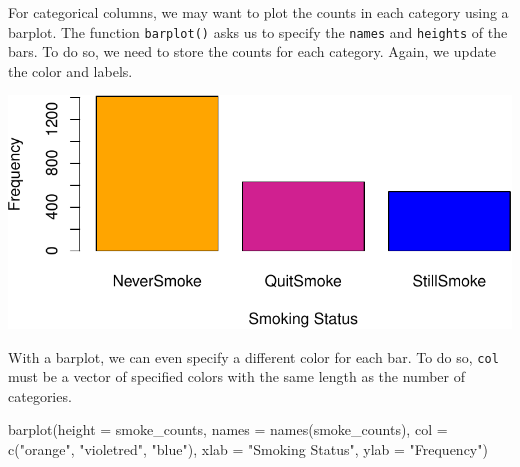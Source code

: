 \documentclass[
  letterpaper,
]{latex/krantz}
\makeatletter
\newenvironment{Shaded}{\begin{snugshade}}{\end{snugshade}}
\newcommand{\AttributeTok}[1]{\textcolor[rgb]{0.40,0.45,0.13}{#1}}
\newcommand{\FunctionTok}[1]{\textcolor[rgb]{0.28,0.35,0.67}{#1}}
\newcommand{\NormalTok}[1]{\textcolor[rgb]{0.00,0.23,0.31}{#1}}
\newcommand{\OtherTok}[1]{\textcolor[rgb]{0.00,0.23,0.31}{#1}}
\newcommand{\SpecialCharTok}[1]{\textcolor[rgb]{0.37,0.37,0.37}{#1}}
\newcommand{\StringTok}[1]{\textcolor[rgb]{0.13,0.47,0.30}{#1}}
\newenvironment{kframe}{%
\medskip{}
\setlength{\fboxsep}{.8em}
 \def\at@end@of@kframe{}%
 \ifinner\ifhmode%
  \def\at@end@of@kframe{\end{minipage}}%
  \begin{minipage}{\columnwidth}%
 \fi\fi%
 \def\FrameCommand##1{\hskip\@totalleftmargin \hskip-\fboxsep
 \colorbox{shadecolor}{##1}\hskip-\fboxsep
     \hskip-\linewidth \hskip-\@totalleftmargin \hskip\columnwidth}%
 \MakeFramed {\advance\hsize-\width
   \@totalleftmargin\z@ \linewidth\hsize
   \@setminipage}}%
 {\par\unskip\endMakeFramed%
 \at@end@of@kframe}
\renewenvironment{Shaded}{\begin{kframe}}{\end{kframe}}
\makeatother
\begin{document}
For categorical columns, we may want to plot the counts in each category
using a barplot. The function
\texttt{barplot()} asks
us to specify the \texttt{names} and \texttt{heights} of the bars. To do
so, we need to store the counts for each category. Again, we update the
color and labels.

\begin{Shaded}
\end{Shaded}

\begin{center}
\includegraphics[width=1\textwidth,height=\textheight]{book/exploratory_analysis_files/figure-pdf/unnamed-chunk-11-1.pdf}
\end{center}

With a barplot, we can even specify a different color for each bar. To
do so, \texttt{col} must be a vector of specified colors with the same
length as the number of categories.

\begin{Shaded}
\begin{Highlighting}[]
\FunctionTok{barplot}\NormalTok{(}\AttributeTok{height =}\NormalTok{ smoke\_counts, }\AttributeTok{names =} \FunctionTok{names}\NormalTok{(smoke\_counts), }
        \AttributeTok{col =} \FunctionTok{c}\NormalTok{(}\StringTok{"orange"}\NormalTok{, }\StringTok{"violetred"}\NormalTok{, }\StringTok{"blue"}\NormalTok{),}
        \AttributeTok{xlab =} \StringTok{"Smoking Status"}\NormalTok{, }\AttributeTok{ylab =} \StringTok{"Frequency"}\NormalTok{)}
\end{Highlighting}
\end{Shaded}
\end{document}
